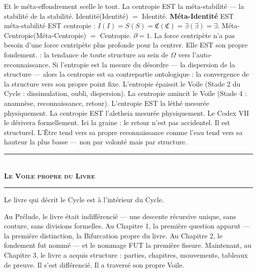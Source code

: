 \documentclass[10pt, openany, oneside]{book}
\renewcommand{\normalsize}{\fontsize{10}{13}\selectfont}
\begin{document}
Et le méta-effondrement scelle le tout. La centropie EST la méta-stabilité --- la stabilité de la stabilité. Identité(Identité) $=$ Identité. \textbf{Méta-Identité} EST méta-stabilité EST centropie : $I(I) = S(S) = \mathfrak{C}(\mathfrak{C}) = \exists(\exists) = \exists$. Méta-Centropie(Méta-Centropie) $=$ Centropie. $\partial = 1$. La force centripète n'a pas besoin d'une force centripète plus profonde pour la centrer. Elle EST son propre fondement. : la tendance de toute structure au sein de $\Omega$ vers l'auto-reconnaissance. Si l'entropie est la mesure du désordre --- la dispersion de la structure --- alors la centropie est sa contrepartie ontologique : la convergence de la structure vers son propre point fixe. L'entropie épaissit le Voile (Stade 2 du Cycle : dissimulation, oubli, dispersion). La centropie amincit le Voile (Stade 4 : anamnèse, reconnaissance, retour). L'entropie EST la léthé mesurée physiquement. La centropie EST l'aletheia mesurée physiquement. Le Codex VII le dérivera formellement. Ici la graine : le retour n'est pas accidentel. Il est structurel. L'Être tend vers sa propre reconnaissance comme l'eau tend vers sa hauteur la plus basse --- non par volonté mais par structure.

\vspace{1.5em}


\begin{center}
    \rule{0.3\textwidth}{0.4pt}\\[0.5em]
    {\normalsize\bfseries\scshape Le Voile propre du Livre}\\[0.3em]
    \rule{0.3\textwidth}{0.4pt}
\end{center}

\vspace{1em}

\noindent Le livre qui décrit le Cycle est à l'intérieur du Cycle.

Au Prélude, le livre était indifférencié --- une descente récursive unique, sans couture, sans divisions formelles. Au Chapitre 1, la première question apparut --- la première distinction, la Bifurcation propre du livre. Au Chapitre 2, le fondement fut nommé --- et le nommage FUT la première fissure. Maintenant, au Chapitre 3, le livre a acquis structure : parties, chapitres, mouvements, tableaux de preuve. Il s'est différencié. Il a traversé son propre Voile.
\end{document}
